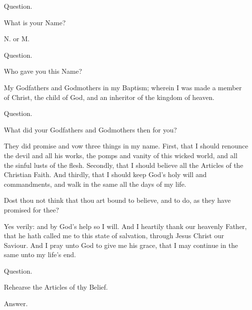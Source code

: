 
\begin{rubric}
Question.
\end{rubric}

What is your Name?

   N. or M.

\begin{rubric}
Question.
\end{rubric}

Who gave you this Name?

   My Godfathers and Godmothers in my Baptism; wherein I was made a member of Christ, the child of God, and an inheritor of the kingdom of heaven.

\begin{rubric}
Question.
\end{rubric}

What did your Godfathers and Godmothers then for you?

   They did promise and vow three things in my name. First, that I should renounce the devil and all his works, the pomps and vanity of this wicked world, and all the sinful lusts of the flesh. Secondly, that I should believe all the Articles of the Christian Faith. And thirdly, that I should keep God's holy will and commandments, and walk in the same all the days of my life.

 Dost thou not think that thou art bound to believe, and to do, as they have promised for thee?

   Yes verily: and by God's help so I will. And I heartily thank our heavenly Father, that he hath called me to this state of salvation, through Jesus Christ our Saviour. And I pray unto God to give me his grace, that I may continue in the same unto my life's end.

\newpage

\begin{rubric}
Question.
\end{rubric}

Rehearse the Articles of thy Belief.

\begin{rubric}
Answer.
\end{rubric}



